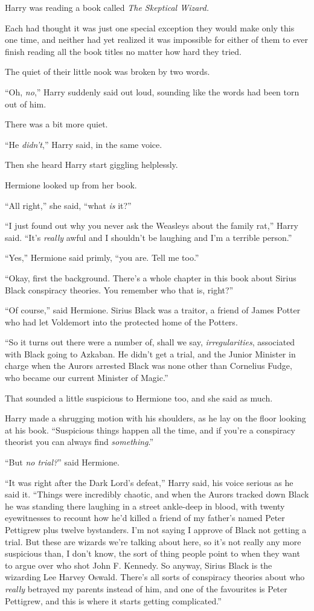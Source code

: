 Harry was reading a book called \emph{The Skeptical Wizard.}

Each had thought it was just one special exception they would make only this one time, and neither had yet realized it was impossible for either of them to ever finish reading all the book titles no matter how hard they tried.

The quiet of their little nook was broken by two words.

“Oh, \emph{no},” Harry suddenly said out loud, sounding like the words had been torn out of him.

There was a bit more quiet.

“He \emph{didn’t},” Harry said, in the same voice.

Then she heard Harry start giggling helplessly.

Hermione looked up from her book.

“All right,” she said, “what \emph{is} it?”

“I just found out why you never ask the Weasleys about the family rat,” Harry said. “It’s \emph{really} awful and I shouldn’t be laughing and I’m a terrible person.”

“Yes,” Hermione said primly, “you are. Tell me too.”

“Okay, first the background. There’s a whole chapter in this book about Sirius Black conspiracy theories. You remember who that is, right?”

“Of course,” said Hermione. Sirius Black was a traitor, a friend of James Potter who had let Voldemort into the protected home of the Potters.

“So it turns out there were a number of, shall we say, \emph{irregularities}, associated with Black going to Azkaban. He didn’t get a trial, and the Junior Minister in charge when the Aurors arrested Black was none other than Cornelius Fudge, who became our current Minister of Magic.”

That sounded a little suspicious to Hermione too, and she said as much.

Harry made a shrugging motion with his shoulders, as he lay on the floor looking at his book. “Suspicious things happen all the time, and if you’re a conspiracy theorist you can always find \emph{something}.”

“But \emph{no trial?}” said Hermione.

“It was right after the Dark Lord’s defeat,” Harry said, his voice serious as he said it. “Things were incredibly chaotic, and when the Aurors tracked down Black he was standing there laughing in a street ankle-deep in blood, with twenty eyewitnesses to recount how he’d killed a friend of my father’s named Peter Pettigrew plus twelve bystanders. I’m not saying I approve of Black not getting a trial. But these are wizards we’re talking about here, so it’s not really any more suspicious than, I don’t know, the sort of thing people point to when they want to argue over who shot John F. Kennedy. So anyway, Sirius Black is the wizarding Lee Harvey Oswald. There’s all sorts of conspiracy theories about who \emph{really} betrayed my parents instead of him, and one of the favourites is Peter Pettigrew, and this is where it starts getting complicated.”

